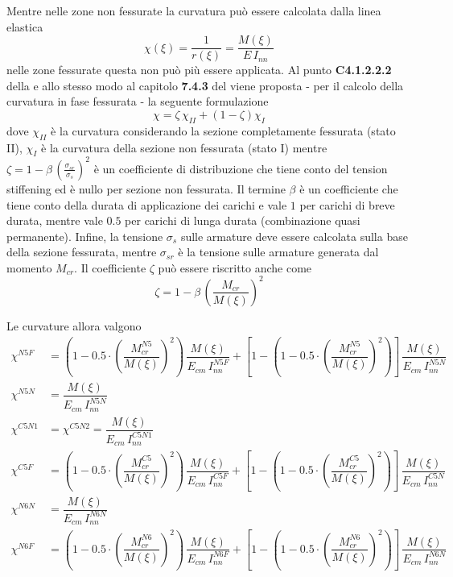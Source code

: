Mentre nelle zone non fessurate la curvatura può essere calcolata dalla linea elastica
\begin{equation}
	\label{eq:lineaElastica}
	\chi (\xi) = \dfrac{1}{r(\xi)} = \dfrac{M(\xi)}{E\,I_{nn}}
\end{equation}
nelle zone fessurate questa non può più essere applicata. Al punto \textbf{C4.1.2.2.2} della \circolare e allo stesso modo al capitolo \textbf{7.4.3} del \ec viene proposta - per il calcolo della curvatura in fase fessurata - la seguente formulazione
\begin{equation}
    \label{eq:curvaturaFessurata}
	\chi = \zeta\,\chi_{II} + (1-\zeta)\chi_I
\end{equation}
dove $\chi_{II}$ è la curvatura considerando la sezione completamente fessurata (stato II), $\chi_I$ è la curvatura della sezione non fessurata (stato I) mentre $\zeta = 1-\beta\,\left(\frac{\sigma_{sr}}{\sigma_s}\right)^2$ è un coefficiente di distribuzione che tiene conto del tension stiffening ed è nullo per sezione non fessurata. Il termine $\beta$ è un coefficiente che tiene conto della durata di applicazione dei carichi e vale $1$ per carichi di breve durata, mentre vale $0.5$ per carichi di lunga durata (combinazione quasi permanente). Infine, la tensione $\sigma_s$ sulle armature deve essere calcolata sulla base della sezione fessurata, mentre $\sigma_{sr}$ è la tensione sulle armature generata dal momento $M_{cr}$. Il
coefficiente $\zeta$ può essere riscritto anche come
\[
\zeta = 1 - \beta\,\left(\dfrac{M_{cr}}{M(\xi)}\right)^2
\]

Le curvature allora valgono
\begin{align*}
	\chi^{N5F} &= \left(1-0.5\cdot\left(\dfrac{M_{cr}^{N5}}{M(\xi)}\right)^2\right)\,\dfrac{M(\xi)}{E_{cm}\,I_{nn}^{N5F}} + \left[ 1 -\left(1-0.5\cdot\left(\dfrac{M_{cr}^{N5}}{M(\xi)}\right)^2\right)\right]\,\dfrac{M(\xi)}{E_{cm}\,I_{nn}^{N5N}}\\
	\chi^{N5N} &= \dfrac{M(\xi)}{E_{cm}\,I_{nn}^{N5N}}\\
	\chi^{C5N1} &= \chi^{C5N2} = \dfrac{M(\xi)}{E_{cm}\,I_{nn}^{C5N1}} \\
	\chi^{C5F} &= \left(1-0.5\cdot\left(\dfrac{M_{cr}^{C5}}{M(\xi)}\right)^2\right)\,\dfrac{M(\xi)}{E_{cm}\,I_{nn}^{C5F}} + \left[ 1 -\left(1-0.5\cdot\left(\dfrac{M_{cr}^{C5}}{M(\xi)}\right)^2\right)\right]\,\dfrac{M(\xi)}{E_{cm}\,I_{nn}^{C5N}}\\
	\chi^{N6N} &= \dfrac{M(\xi)}{E_{cm}\,I_{nn}^{N6N}}\\
	\chi^{N6F} &= \left(1-0.5\cdot\left(\dfrac{M_{cr}^{N6}}{M(\xi)}\right)^2\right)\,\dfrac{M(\xi)}{E_{cm}\,I_{nn}^{N6F}} + \left[ 1 -\left(1-0.5\cdot\left(\dfrac{M_{cr}^{N6}}{M(\xi)}\right)^2\right)\right]\,\dfrac{M(\xi)}{E_{cm}\,I_{nn}^{N6N}}
\end{align*}

